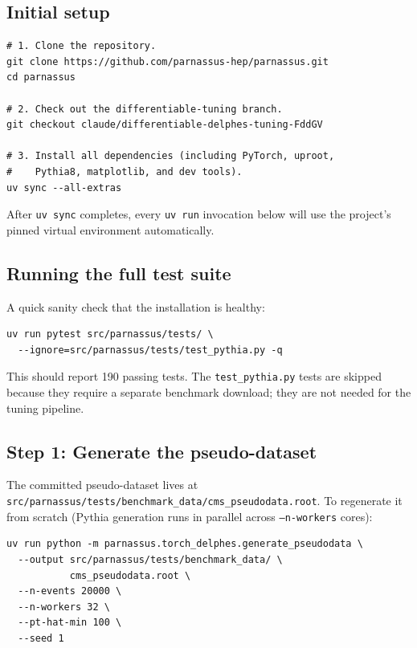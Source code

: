 \documentclass[a4paper,11pt]{article}
\begin{document}
\subsection{Initial setup}

\begin{verbatim}
# 1. Clone the repository.
git clone https://github.com/parnassus-hep/parnassus.git
cd parnassus

# 2. Check out the differentiable-tuning branch.
git checkout claude/differentiable-delphes-tuning-FddGV

# 3. Install all dependencies (including PyTorch, uproot,
#    Pythia8, matplotlib, and dev tools).
uv sync --all-extras
\end{verbatim}

After \texttt{uv sync} completes, every \texttt{uv run} invocation
below will use the project's pinned virtual environment automatically.

\subsection{Running the full test suite}

A quick sanity check that the installation is healthy:

\begin{verbatim}
uv run pytest src/parnassus/tests/ \
  --ignore=src/parnassus/tests/test_pythia.py -q
\end{verbatim}

This should report 190 passing tests. The \texttt{test\_pythia.py}
tests are skipped because they require a separate benchmark download;
they are not needed for the tuning pipeline.

\subsection{Step 1: Generate the pseudo-dataset}
\label{app:step1}

The committed pseudo-dataset lives at\\
\texttt{src/parnassus/tests/benchmark\_data/cms\_pseudodata.root}.
To regenerate it from scratch (Pythia generation runs in parallel
across \texttt{--n-workers} cores):

\begin{verbatim}
uv run python -m parnassus.torch_delphes.generate_pseudodata \
  --output src/parnassus/tests/benchmark_data/ \
           cms_pseudodata.root \
  --n-events 20000 \
  --n-workers 32 \
  --pt-hat-min 100 \
  --seed 1
\end{verbatim}
\end{document}
